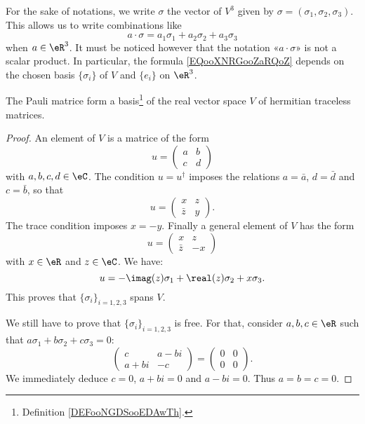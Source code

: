 For the sake of notations, we write \( \sigma\) the vector of \( V^3\) given by \( \sigma=(\sigma_1, \sigma_2, \sigma_3)\). This allows us to write combinations like
\begin{equation}        \label{EQooXNRGooZaRQoZ}
	a\cdot \sigma=a_1\sigma_1+a_2\sigma_2+a_3\sigma_3
\end{equation}
when \( a\in \eR^3\). It must be noticed however that the notation «\( a\cdot \sigma\)» is not a scalar product. In particular, the formula \eqref{EQooXNRGooZaRQoZ} depends on the chosen basis \( \{ \sigma_i \}\) of \( V\) and \( \{ e_i \}\) on \( \eR^3\).

\begin{lemma}       \label{LEMooZNCQooLgoReX}
	The Pauli matrice form a basis\footnote{Definition \ref{DEFooNGDSooEDAwTh}.} of the real vector space \( V\) of hermitian traceless matrices.
\end{lemma}

\begin{proof}
	An element of \( V\) is a matrice of the form
	\begin{equation}
		u=\begin{pmatrix}
			a & b \\
			c & d
		\end{pmatrix}
	\end{equation}
	with \( a,b,c,d\in \eC\). The condition \( u=u^{\dag}\) imposes the relations \( a=\bar a\), \( d=\bar d\) and \( c=\bar b\), so that
	\begin{equation}
		u=\begin{pmatrix}
			x      & z \\
			\bar z & y
		\end{pmatrix}.
	\end{equation}
	The trace condition imposes \( x=-y\). Finally a general element of \( V\) has the form
	\begin{equation}
		u=\begin{pmatrix}
			x      & z  \\
			\bar z & -x
		\end{pmatrix}
	\end{equation}
	with \( x\in \eR\) and \( z\in \eC\). We have:
	\begin{equation}
		u=-\imag(z)\sigma_1+\real(z)\sigma_2+x\sigma_3.
	\end{equation}
	This proves that \( \{ \sigma_i \}_{i=1,2,3}\) spans \( V\).

	We still have to prove that \( \{ \sigma_i \}_{i=1,2,3}\) is free. For that, consider \( a,b,c\in \eR\) such that \( a\sigma_1+b\sigma_2+c\sigma_3=0\):
	\begin{equation}
		\begin{pmatrix}
			c    & a-bi \\
			a+bi & -c
		\end{pmatrix}=\begin{pmatrix}
			0 & 0 \\
			0 & 0
		\end{pmatrix}.
	\end{equation}
	We immediately deduce \( c=0\), \( a+bi=0\) and \( a-bi=0\). Thus \( a=b=c=0\).
\end{proof}

